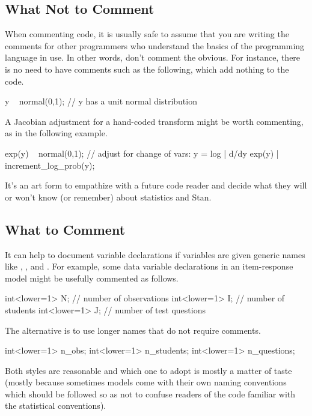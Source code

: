 \subsection{What Not to Comment}

When commenting code, it is usually safe to assume that you are 
writing the comments for other programmers who understand the basics 
of the programming language in use.  In other words, don't comment the
obvious.  For instance, there is no need to have comments
such as the following, which add nothing to the code.
%
\begin{stancode}
y ~ normal(0,1);  // y has a unit normal distribution
\end{stancode}
%
A Jacobian adjustment for a hand-coded transform might be worth
commenting, as in the following example.
%
\begin{stancode}
exp(y) ~ normal(0,1);
// adjust for change of vars: y = log | d/dy exp(y) |
increment_log_prob(y);
\end{stancode}
%
It's an art form to empathize with a future code reader and decide
what they will or won't know (or remember) about statistics and Stan.

\subsection{What to Comment}

It can help to document variable declarations if variables are given
generic names like , , and .  For
example, some data variable declarations in an item-response model
might be usefully commented as follows.
%
\begin{stancode}
int<lower=1> N;   // number of observations
int<lower=1> I;   // number of students
int<lower=1> J;   // number of test questions
\end{stancode}
%
The alternative is to use longer names that do not require comments.
%
\begin{stancode}
int<lower=1> n_obs;
int<lower=1> n_students;
int<lower=1> n_questions;
\end{stancode}
%
Both styles are reasonable and which one to adopt is mostly a matter of
taste (mostly because sometimes models come with their own naming
conventions which should be followed so as not to confuse readers of
the code familiar with the statistical conventions).

